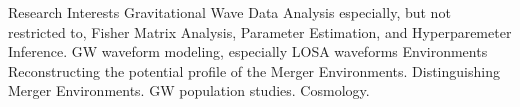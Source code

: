 
\begin{rubric}{Research Interests}
\entry*[] Gravitational Wave Data Analysis especially, but not restricted to, Fisher Matrix Analysis, Parameter Estimation, and Hyperparemeter Inference.
\entry*[] GW waveform modeling, especially LOSA waveforms
\entry*[] Environments Reconstructing the potential profile of the Merger Environments.
\entry*[] Distinguishing Merger Environments. 
\entry*[] GW population studies.
\entry*[] Cosmology.
    
\end{rubric}
